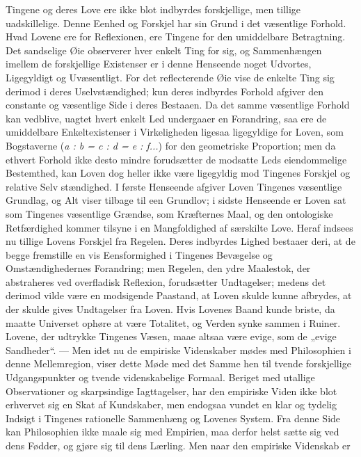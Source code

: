 \documentclass[12pt]{book}
\newcommand{\opage}[1]{\marginnote{\footnotesize\textit{[#1]}}}
\begin{document}
Tingene og deres Love ere ikke blot indbyrdes forskjellige, men tillige uadskillelige. Denne
Eenhed og Forskjel har sin Grund i det væsentlige Forhold. Hvad Lovene ere for Reflexionen, ere
Tingene for den umiddelbare Betragtning. Det sandselige Øie observerer hver enkelt Ting for sig,
og Sammenhængen imellem de forskjellige Existenser er i denne Henseende noget Udvortes,
Ligegyldigt og Uvæsentligt. For det reflecterende Øie vise de enkelte Ting sig derimod i deres
Uselvstændighed; kun deres indbyrdes Forhold afgiver den constante og væsentlige Side i deres
Bestaaen. Da det samme væsentlige Forhold kan vedblive, uagtet hvert enkelt Led undergaaer en
Forandring, saa ere de umiddelbare Enkeltexistenser i Virkeligheden ligesaa ligegyldige for
Loven, som Bogstaverne (\textit{a : b = c : d = e : f...}) for den geometriske Proportion; men da
ethvert Forhold ikke desto mindre forudsætter de modsatte Leds eiendommelige Bestemthed, kan
Loven dog heller ikke være ligegyldig mod Tingenes Forskjel og relative Selv%
\opage{145}stændighed. I første Henseende afgiver Loven Tingenes væsentlige Grundlag, og Alt viser
tilbage til een Grundlov; i sidste Henseende er Loven sat som Tingenes væsentlige Grændse,
som Kræfternes Maal, og den ontologiske Retfærdighed kommer tilsyne i en Mangfoldighed af
særskilte Love. Heraf indsees nu tillige Lovens Forskjel fra Regelen. Deres indbyrdes Lighed
bestaaer deri, at de begge fremstille en vis Eensformighed i Tingenes Bevægelse og
Omstændighedernes Forandring; men Regelen, den ydre Maalestok, der abstraheres ved
overfladisk Reflexion, forudsætter Undtagelser; medens det derimod vilde være en modsigende
Paastand, at Loven skulde kunne afbrydes, at der skulde gives Undtagelser fra Loven. Hvis
Lovenes Baand kunde briste, da maatte Universet ophøre at være Totalitet, og Verden synke
sammen i Ruiner. Lovene, der udtrykke Tingenes Væsen, maae altsaa være evige, som de „evige
Sandheder“. --- Men idet nu de empiriske Videnskaber mødes med Philosophien i denne
Mellemregion, viser dette Møde med det Samme hen til tvende forskjellige Udgangspunkter og
tvende videnskabelige Formaal. Beriget med utallige Observationer og skarpsindige
Iagttagelser, har den empiriske Viden ikke blot erhvervet sig en Skat af Kundskaber, men
endogsaa vundet en klar og tydelig Indsigt i Tingenes rationelle Sammenhæng og Lovenes
System. Fra denne Side kan Philosophien ikke maale sig med Empirien, maa derfor helst sætte
sig ved dens Fødder, og gjøre sig til dens Lærling. Men naar den empiriske Videnskab er
\end{document}
